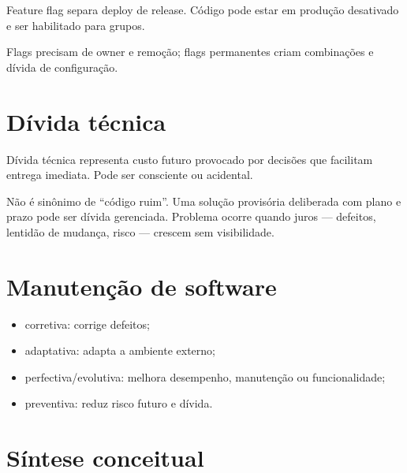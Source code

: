 Feature flag separa deploy de release. Código pode estar em produção desativado e ser habilitado para grupos.

Flags precisam de owner e remoção; flags permanentes criam combinações e dívida de configuração.

\section{Dívida técnica}

Dívida técnica representa custo futuro provocado por decisões que facilitam entrega imediata. Pode ser consciente ou acidental.

Não é sinônimo de ``código ruim''. Uma solução provisória deliberada com plano e prazo pode ser dívida gerenciada. Problema ocorre quando juros — defeitos, lentidão de mudança, risco — crescem sem visibilidade.

\section{Manutenção de software}

\begin{itemize}
\item corretiva: corrige defeitos;
\item adaptativa: adapta a ambiente externo;
\item perfectiva/evolutiva: melhora desempenho, manutenção ou funcionalidade;
\item preventiva: reduz risco futuro e dívida.
\end{itemize}

\section{Síntese conceitual}

